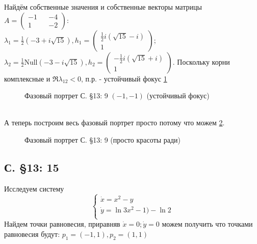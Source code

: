 \documentclass{article}
\begin{document}
Найдём собственные значения и собственные векторы матрицы $A=\begin{pmatrix} -1 && -4 \\ 1 && -2 \end{pmatrix}$:\\
 $\lambda_1=\frac{1}{2} \left(-3+i \sqrt{15}\right),
 h_1 = \begin{pmatrix} \frac{1}{2} i \left(\sqrt{15}-i\right) \\  1 \end{pmatrix} $; 
 $\lambda_2= \frac{1}{2}\text{Null}\left(-3-i \sqrt{15}\right),
 h_2 = \begin{pmatrix} -\frac{1}{2} i \left(\sqrt{15}+i\right)  \\  1 \end{pmatrix} $. 
 Поскольку корни комплексные и $\Re \lambda_{12}<0$, п.р. - устойчивый фокус \ref{13.9.2}
 \begin{figure}[ht]
\caption{Фазовый портрет С. \S13: 9 $(-1,-1)$ (устойчивый фокус)}
\label{13.9.2}
\end{figure}\\

А теперь построим весь фазовый портрет просто потому что можем \ref{13.9.3}.\\

\begin{figure}[ht]
\caption{Фазовый портрет С. \S13: 9  (просто красоты ради)}
\label{13.9.3}
\end{figure}

\subsection{С. \S13: 15}
Исследуем систему 
\begin{equation}
\begin{cases}
        \dot{x}=x^2-y\\
        \dot{y}=\ln{3x^2-1)}-\ln{2}\\
    \end{cases}    
\end{equation}
Найдем точки равновесия, приравняв $\dot{x}=0; \dot{y}=0$ можем получить что точками равновесия будут: $p_1=(-1,1),p_2=(1,1)$\\
\end{document}
